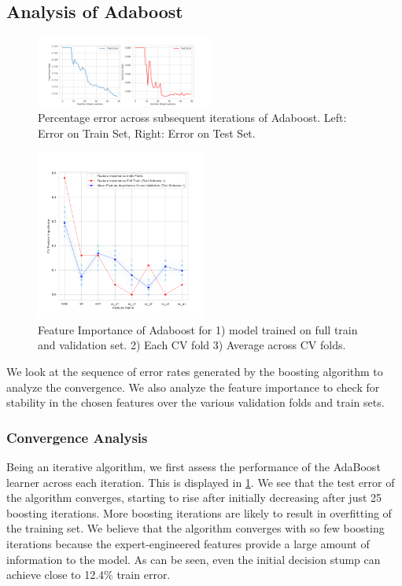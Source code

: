 \documentclass[11pt, letterpaper, journal]{IEEEtran}
\begin{document}
\subsection{Analysis of Adaboost}
\begin{figure}[h]
    \centering
    \includegraphics[width=0.52\textwidth]{statics/ada_iterations.png}
    \caption{Percentage error across subsequent iterations of Adaboost. Left: Error on Train Set, Right: Error on Test Set.}
    \label{fig:Adaboost_iterations}
\end{figure}

\begin{figure}[h]
    \centering
    \includegraphics[width=0.5\textwidth]{statics/Feature_importance_test_scheme1.png}
    \caption{Feature Importance of Adaboost for 1) model trained on full train and validation set. 2) Each CV fold 3) Average across CV folds.}
    \label{fig:Feature_importance ts1}
\end{figure}

We look at the sequence of error rates generated by the boosting algorithm to analyze the convergence. We also analyze the feature importance to check for stability in the chosen features over the various validation folds and train sets.

\subsubsection{Convergence Analysis}
Being an iterative algorithm, we first assess the performance of the AdaBoost learner across each iteration. This is displayed in \ref{fig:Adaboost_iterations}. We see that the test error of the algorithm converges, starting to rise after initially decreasing after just 25 boosting iterations. More boosting iterations are likely to result in overfitting of the training set. We believe that the algorithm converges with so few boosting iterations because the expert-engineered features provide a large amount of information to the model. As can be seen, even the initial decision stump can achieve close to 12.4\% train error.
\end{document}
